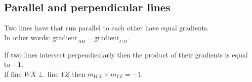 \subsection*{Parallel and perpendicular lines}    
% 
Two lines have that run parallel to each other have equal gradients. \\
In other words: $\mbox{gradient}_{AB}=\mbox{gradient}_{CD}$. \par
If two lines intersect perpendicularly then the product of their gradients is equal to $-1$. \\

If line $WX \perp $ line $ YZ$ then $m_{WX} \times m_{YZ} = -1$.

